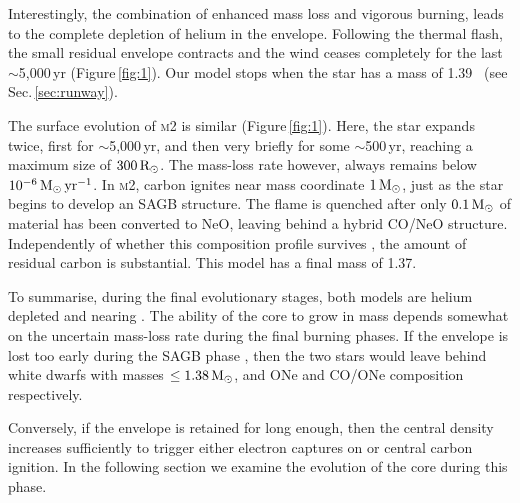 \documentclass[twocolumn,tighten,times]{aastex62}
\begin{document}
Interestingly, the combination of enhanced mass loss and vigorous burning, leads to the complete depletion of helium in the envelope. 
Following the thermal flash, the small residual envelope contracts and the wind ceases completely for the last $\sim$5,000\,yr (Figure\,\ref{fig:1}). Our model stops when the star has a mass of 1.39\msun~ (see Sec.\,\ref{sec:runway}).  

The surface evolution of \textsc{m2} is similar (Figure\,\ref{fig:1}). Here, 
the star expands twice, first for $\sim$5,000\,yr, and then very briefly for some 
$\sim$500\,yr, reaching a maximum size of $300\mathrm{\,R_\odot}$. The mass-loss rate however, always remains 
below $10^{-6}\mathrm{\,M_{\odot}\,yr^{-1}}$. In \textsc{m2}, carbon ignites near mass coordinate $1\mathrm{\,M_\odot}$, 
just as the star begins to develop an SAGB structure. The flame is quenched after only 
$0.1\mathrm{\,M_\odot}$ of material has been converted to NeO, leaving behind a hybrid CO/NeO structure. Independently of whether this composition profile survives \citep{brooks2017}, the amount of residual  carbon is substantial. This model has a final mass of 1.37\msun. 

To summarise, during the final evolutionary stages, both models are helium 
depleted and  nearing \mch. The ability of the core 
to grow in mass depends somewhat on the uncertain mass-loss rate during the final burning phases. If the envelope 
is lost too early during the SAGB phase , then the two stars would 
leave behind white dwarfs with masses $\le 1.38\mathrm{\,M_\odot}$, and ONe and CO/ONe composition respectively. 

Conversely, if the envelope is retained for long enough, then the central density increases sufficiently to trigger either electron captures on  or central carbon ignition. 
In the following section we examine the evolution of the core during this phase. 
\end{document}
